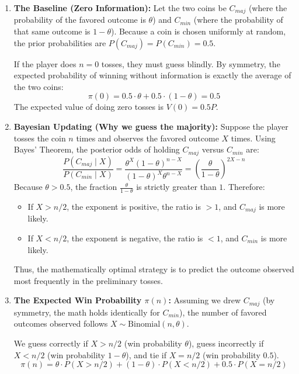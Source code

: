 \begin{enumerate}
    \item \textbf{The Baseline (Zero Information):} Let the two coins be $C_{maj}$ (where the probability of the favored outcome is $\theta$) and $C_{min}$ (where the probability of that same outcome is $1-\theta$). Because a coin is chosen uniformly at random, the prior probabilities are $P(C_{maj}) = P(C_{min}) = 0.5$.
    
    If the player does $n=0$ tosses, they must guess blindly. By symmetry, the expected probability of winning without information is exactly the average of the two coins:
    \begin{equation}
        \pi(0) = 0.5 \cdot \theta + 0.5 \cdot (1-\theta) = 0.5
    \end{equation}
    The expected value of doing zero tosses is $V(0) = 0.5P$.
    
    \item \textbf{Bayesian Updating (Why we guess the majority):} Suppose the player tosses the coin $n$ times and observes the favored outcome $X$ times. Using Bayes' Theorem, the posterior odds of holding $C_{maj}$ versus $C_{min}$ are:
    \begin{equation}
        \frac{P(C_{maj} \mid X)}{P(C_{min} \mid X)} = \frac{\theta^X (1-\theta)^{n-X}}{(1-\theta)^X \theta^{n-X}} = \left( \frac{\theta}{1-\theta} \right)^{2X - n}
    \end{equation}
    Because $\theta > 0.5$, the fraction $\frac{\theta}{1-\theta}$ is strictly greater than $1$. Therefore:
    \begin{itemize}
        \item If $X > n/2$, the exponent is positive, the ratio is $> 1$, and $C_{maj}$ is more likely.
        \item If $X < n/2$, the exponent is negative, the ratio is $< 1$, and $C_{min}$ is more likely.
    \end{itemize}
    Thus, the mathematically optimal strategy is to predict the outcome observed most frequently in the preliminary tosses.
    
    \item \textbf{The Expected Win Probability $\pi(n)$:} Assuming we drew $C_{maj}$ (by symmetry, the math holds identically for $C_{min}$), the number of favored outcomes observed follows $X \sim \text{Binomial}(n, \theta)$. 
    
    We guess correctly if $X > n/2$ (win probability $\theta$), guess incorrectly if $X < n/2$ (win probability $1-\theta$), and tie if $X = n/2$ (win probability $0.5$).
    \begin{equation}
        \pi(n) = \theta \cdot P(X > n/2) + (1-\theta) \cdot P(X < n/2) + 0.5 \cdot P(X = n/2)
    \end{equation}
    

\end{enumerate}

